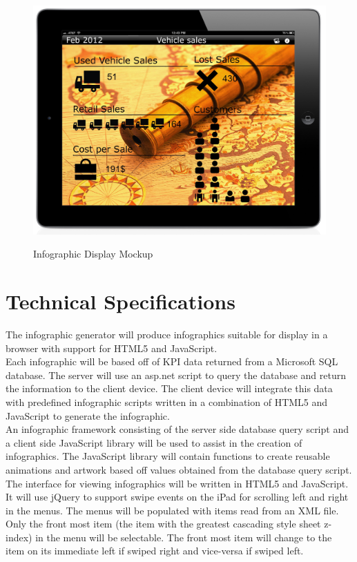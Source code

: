 \documentclass[11pt,a4paper,oneside]{article}
\begin{document}
\begin{figure}[!]
\caption{Infographic Display Mockup\label{mockup-infographic-display-3}}
\includegraphics[width=1\textwidth]{images/screen4.jpg}\\
\end{figure}

\section{Technical Specifications}

The infographic generator will produce infographics suitable for display in a browser with support for HTML5 and JavaScript.\\


Each infographic will be based off of KPI data returned from a Microsoft SQL database.  The server will use an asp.net script to query the database and return the information to the client device.  The client device will integrate this data with predefined infographic scripts written in a combination of HTML5 and JavaScript to generate the infographic.\\


An infographic framework consisting of the server side database query script and a client side JavaScript library will be used to assist in the creation of infographics.  The JavaScript library will contain functions to create reusable animations and artwork based off values obtained from the database query script.\\


The interface for viewing infographics will be written in HTML5 and JavaScript.  It will use jQuery to support swipe events on the iPad for scrolling left and right in the menus.  The menus will be populated with items read from an XML file.  Only the front most item (the item with the greatest cascading style sheet z-index) in the menu will be selectable.  The front most item will change to the item on its immediate left if swiped right and vice-versa if swiped left.\\
\end{document}
